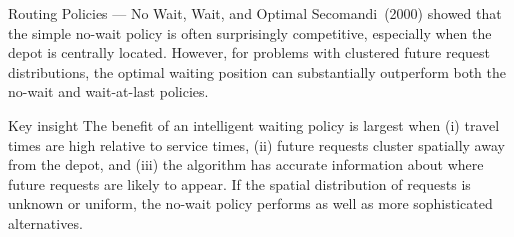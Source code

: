 \documentclass[aspectratio=169,10pt]{beamer}
\begin{document}
\begin{frame}[allowframebreaks]{Routing Policies — No Wait, Wait, and Optimal}
  Secomandi~(2000) showed that the simple no-wait policy is often surprisingly
  competitive, especially when the depot is centrally located.  However, for
  problems with clustered future request distributions, the optimal waiting
  position can substantially outperform both the no-wait and wait-at-last
  policies.

  \begin{alertblock}{Key insight}
    The benefit of an intelligent waiting policy is largest when (i) travel
    times are high relative to service times, (ii) future requests cluster
    spatially away from the depot, and (iii) the algorithm has accurate
    information about where future requests are likely to appear.
    If the spatial distribution of requests is unknown or uniform, the
    no-wait policy performs as well as more sophisticated alternatives.
  \end{alertblock}

\end{frame}
\end{document}
